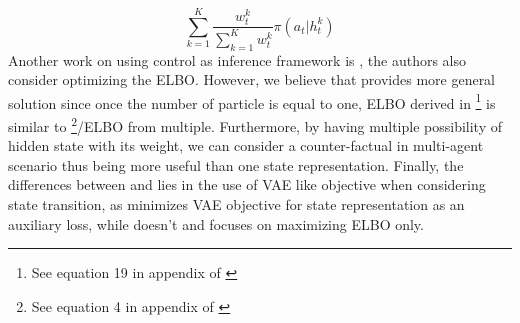 \begin{equation}
    \sum^K_{k=1} \frac{w^k_{t}}{\sum^K_{k=1}w^k_{t}} \pi(a_t | h_t^k)
\end{equation}
Another work on using control as inference framework is \cite{huangsvqn}, the authors also consider optimizing the ELBO. However, we believe that \cite{shvechikovjoint} provides more general solution since once the number of particle is equal to one, ELBO derived in \cite{huangsvqn}\footnote{See equation 19 in appendix of \cite{huangsvqn}} is similar to \cite{shvechikovjoint}\footnote{See equation 4 in appendix of \cite{shvechikovjoint}}/ELBO from multiple. Furthermore, by having multiple possibility of hidden state with its weight, we can consider a counter-factual in multi-agent scenario thus being more useful than one state representation. Finally, the differences between \cite{huangsvqn} and \cite{shvechikovjoint} lies in the use of VAE like objective when considering state transition, as \cite{huangsvqn} minimizes VAE objective for state representation as an auxiliary loss, while \cite{shvechikovjoint} doesn't and focuses on maximizing ELBO only.